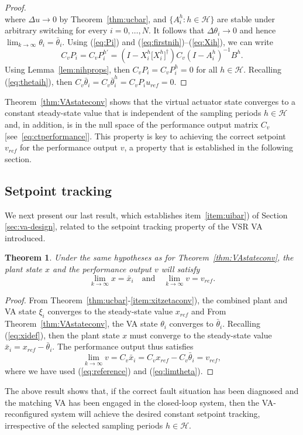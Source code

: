\documentclass[letterpaper, 10 pt, conference]{ieeeconf}
\newcommand{\Hset}{\mathcal{H}}
\newtheorem{thm}{Theorem}
\begin{document}
\begin{proof}
\begin{equation*}
  \end{equation*}
  where $\Delta u \to 0$ by Theorem~\ref{thm:ucbar}, and $\{A_i^h : h
  \in \Hset\}$ are stable under arbitrary switching for every
  $i=0,\ldots,N$. It follows that $\Delta\theta_i \to 0$ and hence
  $\lim_{k\to\infty} \theta_i = \bar\theta_i$. Using (\ref{eq:Pi}) and
  (\ref{eq:firstnih})--(\ref{eq:Xih}), we can write
  \begin{equation*}
    C_v P_i = C_v P_i^{h'} = \left(I - X_i^h \big[X_i^h\big]^\dagger \right) C_v (I-A_i^h)^{-1} B^h.
  \end{equation*}
  Using Lemma~\ref{lem:nihprops}, then $C_v P_i = C_v P_i^h = 0$ for
  all $h\in\Hset$. Recalling (\ref{eq:thetaih}), then $C_v
  \bar\theta_i = C_v \bar\theta_i^h = C_v P_i u_{ref} = 0$.
\end{proof}

Theorem~\ref{thm:VAstateconv} shows that the virtual actuator state
converges to a constant steady-state value that is independent of the
sampling periods $h \in \mathcal{H}$ and, in addition, is in the null
space of the performance output matrix $C_v$
[see~\eqref{eq:ctperformance}]. This property is key to achieving the
correct setpoint $v_{ref}$ for the performance output $v$, a property
that is established in the following section.

\subsection{Setpoint tracking}
\label{sec:tracking}
We next present our last result, which establishes
item~\ref{item:uibar}) of Section \ref{sec:va-design}, related to the
setpoint tracking property of the VSR VA introduced.
\begin{thm}
 \label{thm:1}
 Under the same hypotheses as for Theorem~\ref{thm:VAstateconv}, the
 plant state $x$ and the performance output $v$ will satisfy
 \begin{equation*}
   \lim_{k\to\infty} x = \bar x_i \quad\text{and}\quad
   \lim_{k\to\infty} v = v_{ref}.
 \end{equation*}
\end{thm}
\begin{proof}
  From Theorem~\ref{thm:ucbar}-\ref{item:xitzetaconv}), the combined
  plant and VA state $\xi_i$ converges to the steady-state value
  $x_{ref}$ and From Theorem~\ref{thm:VAstateconv}, the VA state
  $\theta_i$ converges to $\bar\theta_i$. Recalling (\ref{eq:xidef}),
  then the plant state $x$ must converge to the steady-state value
  $\bar x_i = x_{ref} - \bar\theta_i$. The performance output thus
  satisfies
  \begin{equation*}
    \lim_{k\to\infty} v = C_v \bar x_i = C_v x_{ref} - C_v \bar
    \theta_i = v_{ref},
  \end{equation*}
  where we have used (\ref{eq:reference}) and (\ref{eq:limtheta}).
\end{proof}
The above result shows that, if the correct fault situation has been
diagnosed and the matching VA has been engaged in the closed-loop
system, then the VA-reconfigured system will achieve the desired
constant setpoint tracking, irrespective of the selected sampling
periods $h \in \mathcal{H}$.
\end{document}
